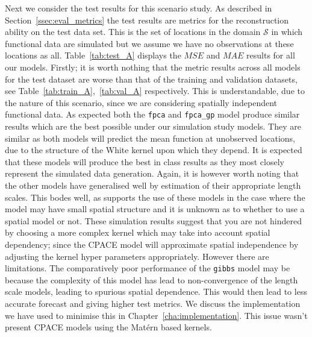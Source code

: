 Next we consider the test results for this scenario study.
As described in Section~\ref{ssec:eval_metrics} the test results are metrics for the reconstruction ability on the test data set.
This is the set of locations in the domain $\mathcal{S}$ in which functional data are simulated but we assume we have no observations at these locations as all.
Table~\ref{tab:test_A} displays the $MSE$ and $MAE$ results for all our models.
Firstly; it is worth nothing that the metric results across all models for the test dataset are worse than that of the training and validation datasets, see Table~\ref{tab:train_A},~\ref{tab:val_A} respectively.
This is understandable, due to the nature of this scenario, since we are considering spatially independent functional data.
As expected both the \verb*|fpca| and \verb*|fpca_gp| model produce similar results which are the best possible under our simulation study models.
They are similar as both models will predict the mean function at unobserved locations, due to the structure of the White kernel upon which they depend.
It is expected that these models will produce the best in class results as they most closely represent the simulated data generation. 
Again, it is however worth noting that the other models have generalised well by estimation of their appropriate length scales.
This bodes well, as supports the use of these models in the case where the model may have small spatial structure and it is unknown as to whether to use a spatial model or not.
These simulation results suggest that you are not hindered by choosing a more complex kernel which may take into account spatial dependency; since the CPACE model will approximate spatial independence by adjusting the kernel hyper parameters appropriately.
However there are limitations.
The comparatively poor performance of the \verb*|gibbs| model may be because the complexity of this model has lead to non-convergence of the length scale models, leading to spurious spatial dependence.
This would then lead to less accurate forecast and giving higher test metrics.
We discuss the implementation we have used to minimise this in Chapter~\ref{cha:implementation}.
This issue wasn't present CPACE models using the Mat\'ern based kernels.

